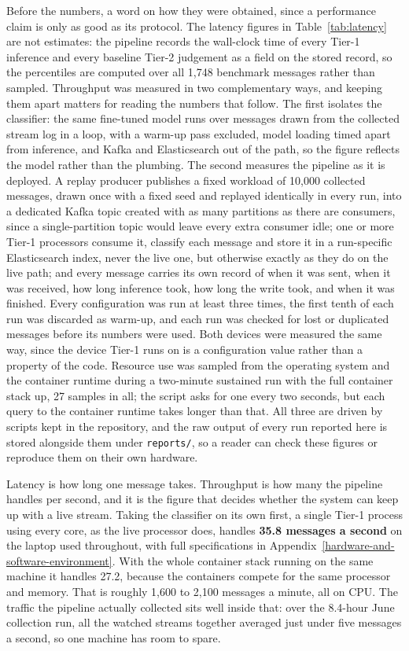 Before the numbers, a word on how they were obtained, since a performance claim is only as good as its protocol. The latency figures in Table~\ref{tab:latency} are not estimates: the pipeline records the wall-clock time of every Tier-1 inference and every baseline Tier-2 judgement as a field on the stored record, so the percentiles are computed over all 1,748 benchmark messages rather than sampled. Throughput was measured in two complementary ways, and keeping them apart matters for reading the numbers that follow. The first isolates the classifier: the same fine-tuned model runs over messages drawn from the collected stream log in a loop, with a warm-up pass excluded, model loading timed apart from inference, and Kafka and Elasticsearch out of the path, so the figure reflects the model rather than the plumbing. The second measures the pipeline as it is deployed. A replay producer publishes a fixed workload of 10,000 collected messages, drawn once with a fixed seed and replayed identically in every run, into a dedicated Kafka topic created with as many partitions as there are consumers, since a single-partition topic would leave every extra consumer idle; one or more Tier-1 processors consume it, classify each message and store it in a run-specific Elasticsearch index, never the live one, but otherwise exactly as they do on the live path; and every message carries its own record of when it was sent, when it was received, how long inference took, how long the write took, and when it was finished. Every configuration was run at least three times, the first tenth of each run was discarded as warm-up, and each run was checked for lost or duplicated messages before its numbers were used. Both devices were measured the same way, since the device Tier-1 runs on is a configuration value rather than a property of the code. Resource use was sampled from the operating system and the container runtime during a two-minute sustained run with the full container stack up, 27 samples in all; the script asks for one every two seconds, but each query to the container runtime takes longer than that. All three are driven by scripts kept in the repository, and the raw output of every run reported here is stored alongside them under \texttt{reports/}, so a reader can check these figures or reproduce them on their own hardware.

Latency is how long one message takes. Throughput is how many the pipeline handles per second, and it is the figure that decides whether the system can keep up with a live stream. Taking the classifier on its own first, a single Tier-1 process using every core, as the live processor does, handles \textbf{35.8 messages a second} on the laptop used throughout, with full specifications in Appendix~\ref{hardware-and-software-environment}. With the whole container stack running on the same machine it handles 27.2, because the containers compete for the same processor and memory. That is roughly 1,600 to 2,100 messages a minute, all on CPU. The traffic the pipeline actually collected sits well inside that: over the 8.4-hour June collection run, all the watched streams together averaged just under five messages a second, so one machine has room to spare.

